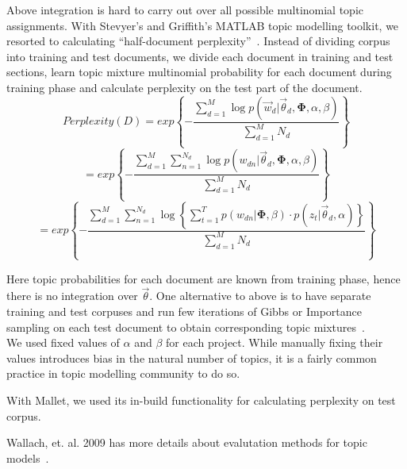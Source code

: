 \documentclass[12pt]{article}
\begin{document}
Above integration is hard to carry out over all possible multinomial topic assignments. With Stevyer's and Griffith's MATLAB topic modelling toolkit, we resorted to calculating ``half-document perplexity''~\cite{asuncion2012smoothing}. Instead of dividing corpus into training and test documents, we divide each document in training and test sections, learn topic mixture multinomial probability for each document during training phase and calculate perplexity on the test part of the document.
\begin{equation*}
Perplexity(D) = exp\left\{-\frac{\sum_{d=1}^M \log p(\vec w_{d}|\vec\theta_d, \mathbf{\Phi}, \alpha, \beta)}{\sum_{d=1}^M N_d}\right\}
\end{equation*}
\begin{equation*}
 = exp\left\{-\frac{\sum_{d=1}^M \sum_{n=1}^{N_d}\log p(w_{dn}|\vec\theta_d, \mathbf{\Phi}, \alpha, \beta)}{\sum_{d=1}^M N_d}\right\}
\end{equation*}
\begin{equation*}
 = exp\left\{-\frac{\sum_{d=1}^M \sum_{n=1}^{N_d}\log\left\{\sum_{t=1}^Tp(w_{dn}|\mathbf{\Phi}, \beta)\cdot p(z_t|\vec\theta_d, \alpha)\right\}}{\sum_{d=1}^M N_d}\right\}
\end{equation*}

Here topic probabilities for each document are known from training phase, hence there is no integration over $\vec\theta$. One alternative to above is to have separate training and test corpuses and run few iterations of Gibbs or Importance sampling on each test document to obtain corresponding topic mixtures~\cite{wallach2009evaluation}.\\
We used fixed values of $\alpha$ and $\beta$ for each project. While manually fixing their values introduces bias in the natural number of topics, it is a fairly common practice in topic modelling community to do so.

With Mallet, we used its in-build functionality for calculating perplexity on test corpus.

Wallach, et. al. 2009 has more details about evalutation methods for topic models~\cite{wallach2009evaluation}.
\end{document}
